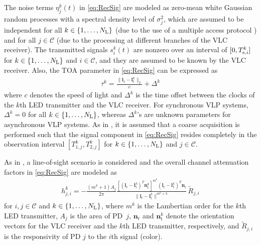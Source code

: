\documentclass[10pt,twocolumn]{IEEEtran}
\newcommand{\Tsik}{{T^k_{{\rm{s}},i}}}
\newcommand{\NL}{N_{\rm{L}}}
\newcommand{\mtC}{{\mathcal{C}}}
\newcommand{\lr}{{\boldsymbol{l}_{\mathrm{r}}}}
\newcommand{\lt}[1]{{\boldsymbol{l}^{#1}_{\mathrm{t}}}}
\newcommand{\nr}{{\boldsymbol{n}_{\mathrm{r}}}}
\newcommand{\nt}[1]{{\boldsymbol{n}^{#1}_{\mathrm{t}}}}
\begin{document}

The noise terms $\eta^k_j(t)$ in \eqref{eq:RecSig} are modeled as zero-mean white Gaussian random processes with a spectral density level of $\sigma_j^2$, which are assumed to be independent for all $k\in\{1,\ldots,\NL\}$ (due to the use of a multiple access protocol \cite{Direct_TCOM,VLC_Survey}) and for all $j\in\mtC$ (due to the processing at different branches of the VLC receiver). The transmitted signals $s^k_i(t)$ are nonzero over an interval of $[0,\Tsik]$ for $k\in\{1,\ldots,\NL\}$ and $i\in\mtC$, and they are assumed to be known by the VLC receiver.
Also, the TOA parameter in \eqref{eq:RecSig} can be expressed as
\begin{gather}\label{eq:tau}
\tau^k=\frac{\|\lr-\lt{k}\|_2}{c}+\Delta^k
\end{gather}
where $c$ denotes the speed of light and $\Delta^k$ is the time offset between the clocks of the $k$th LED transmitter and the VLC receiver. For synchronous VLP systems, $\Delta^k=0$ for all $k\in\{1,\ldots,\NL\}$, whereas $\Delta^k$'s are unknown parameters for asynchronous VLP systems. As in \cite{MFK_CRLB}, it is assumed that a coarse acquisition is performed such that the signal component in \eqref{eq:RecSig} resides completely in the observation interval $[T^k_{1,j},T^k_{2,j}]$ for $k\in\{1,\ldots,\NL\}$ and $j\in\mtC$.

As in \cite{CRB_TOA_VLC,VLP_CRLB_RSS,Direct_TCOM}, a line-of-sight scenario is considered and the overall channel attenuation factors in \eqref{eq:RecSig} are modeled as \cite{WirelessInfComm_97,zhang2014asynchronous,Chvojka15,EPSILON}
\begin{gather} \label{eq:hji}
h^k_{j,i} = - \frac{(m^k + 1)A_j}{2 \pi} \frac{[(\lr - \lt{k})^T \nt{k}]^{m^k} (\lr - \lt{k})^T \nr}{\big\|\lr - \lt{k}\big\|^{m^k + 3}}\,\tilde{R}_{j,i}
\end{gather}
for $i,j\in\mtC$ and $k\in\{1,\ldots,\NL\}$, where $m^k$ is the Lambertian order for the $k$th LED transmitter, $A_j$ is the area of PD~$j$, $\nr$ and $\nt{k}$ denote the orientation vectors for the VLC receiver and the $k$th LED transmitter, respectively, and $\tilde{R}_{j,i}$ is the responsivity of PD $j$ to the $i$th signal (color).
\end{document}
